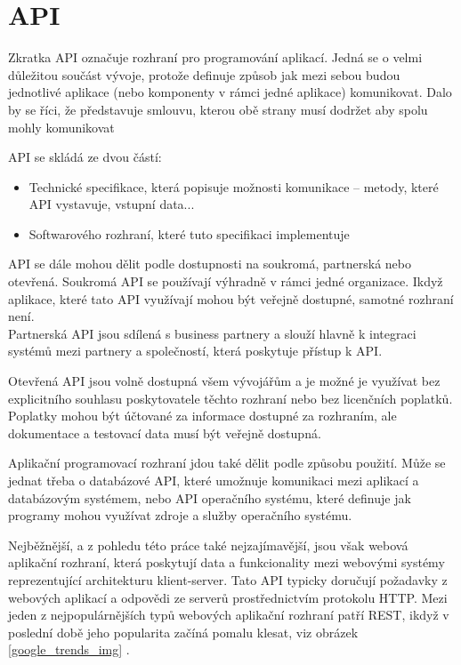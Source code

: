 \documentclass[thesis=M,czech]{FITthesis}[2019/12/23]
\begin{document}
\section{API}
Zkratka API označuje rozhraní pro programování aplikací. Jedná se o velmi důležitou součást vývoje, protože definuje způsob jak mezi sebou budou jednotlivé aplikace (nebo komponenty v rámci jedné aplikace) komunikovat. Dalo by se říci, že představuje smlouvu, kterou obě strany musí dodržet aby spolu mohly komunikovat

API se skládá ze dvou částí: 
\begin{itemize}
    \item Technické specifikace, která popisuje možnosti komunikace -- metody, které API vystavuje, vstupní data...
    \item Softwarového rozhraní, které tuto specifikaci implementuje
\end{itemize}

API se dále mohou dělit podle dostupnosti na soukromá, partnerská nebo otevřená. Soukromá API se používají výhradně v rámci jedné organizace. Ikdyž aplikace, které tato API využívají mohou být veřejně dostupné, samotné rozhraní není.\\

Partnerská API jsou sdílená s business partnery a slouží hlavně k integraci systémů mezi partnery a společností, která poskytuje přístup k API.

Otevřená API jsou volně dostupná všem vývojářům a je možné je využívat bez explicitního souhlasu poskytovatele těchto rozhraní nebo bez licenčních poplatků. Poplatky mohou být účtované za informace dostupné za rozhraním, ale dokumentace a testovací data musí být veřejně dostupná.

Aplikační programovací rozhraní jdou také dělit podle způsobu použití. Může se jednat třeba o databázové API, které umožnuje komunikaci mezi aplikací a databázovým systémem, nebo API operačního systému, které definuje jak programy mohou využívat zdroje a služby operačního systému.

Nejběžnější, a z pohledu této práce také nejzajímavější, jsou však webová aplikační rozhraní, která poskytují data a funkcionality mezi webovými systémy reprezentující architekturu klient-server. Tato API typicky doručují požadavky z webových aplikací a odpovědi ze serverů prostřednictvím protokolu HTTP. Mezi jeden z nejpopulárnějších typů webových aplikační rozhraní patří REST, ikdyž v poslední době jeho popularita začíná pomalu klesat, viz obrázek \ref{google_trends_img} \cite{google-trends}.
\end{document}
